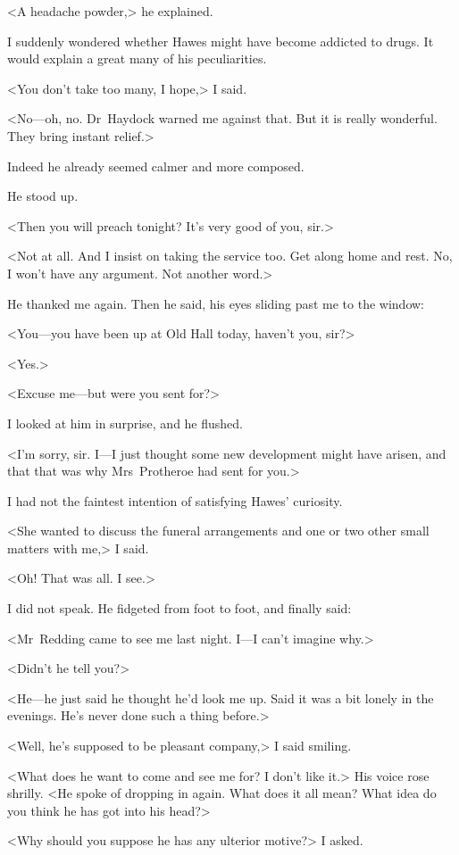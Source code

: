 <A headache powder,> he explained.

I suddenly wondered whether Hawes might have become addicted to drugs. It would explain a great many of his peculiarities.

<You don't take too many, I hope,> I said.

<No—oh, no. Dr~Haydock warned me against that. But it is really wonderful. They bring instant relief.>

Indeed he already seemed calmer and more composed.

He stood up.

<Then you will preach tonight? It's very good of you, sir.>

<Not at all. And I insist on taking the service too. Get along home and rest. No, I won't have any argument. Not another word.>

He thanked me again. Then he said, his eyes sliding past me to the window:

<You—you have been up at Old Hall today, haven't you, sir?>

<Yes.>

<Excuse me—but were you sent for?>

I looked at him in surprise, and he flushed.

<I'm sorry, sir. I—I just thought some new development might have arisen, and that that was why Mrs~Protheroe had sent for you.>

I had not the faintest intention of satisfying Hawes' curiosity.

<She wanted to discuss the funeral arrangements and one or two other small matters with me,> I said.

<Oh! That was all. I see.>

I did not speak. He fidgeted from foot to foot, and finally said:

<Mr~Redding came to see me last night. I—I can't imagine why.>

<Didn't he tell you?>

<He—he just said he thought he'd look me up. Said it was a bit lonely in the evenings. He's never done such a thing before.>

<Well, he's supposed to be pleasant company,> I said smiling.

<What does he want to come and see me for? I don't like it.> His voice rose shrilly. <He spoke of dropping in again. What does it all mean? What idea do you think he has got into his head?>

<Why should you suppose he has any ulterior motive?> I asked.

